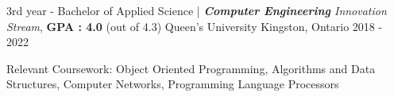 

\begin{cventries}

  \cventry
    {3rd year - Bachelor of Applied Science | \textit{\textbf{Computer Engineering} Innovation Stream}, \textbf{GPA : 4.0} (out of 4.3)} %
    {Queen's University} %
    {Kingston, Ontario} %
    { 2018 - 2022} %
    {
    \begin{cvitems} %
        \item {Relevant Coursework: Object Oriented Programming, Algorithms and Data Structures, Computer Networks, Programming Language Processors}
      \end{cvitems}
    }
\end{cventries}